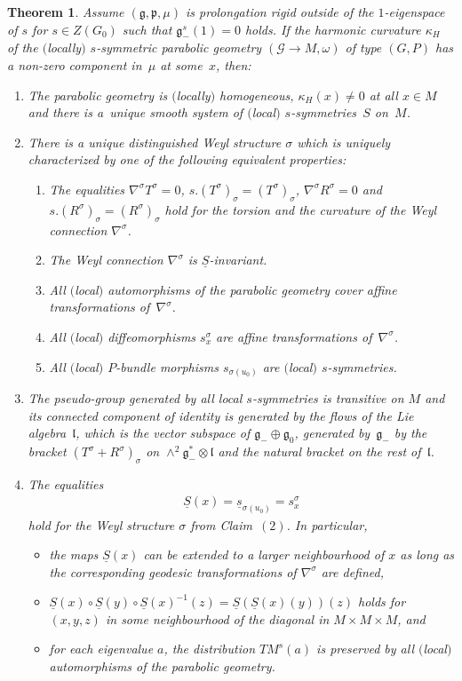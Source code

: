 \documentclass[pdftex]{sigma}
\newcommand{\om}{\omega}
\newcommand{\si}{\sigma}
\newcommand{\un}{\underline}
\newcommand{\ba}{\mathcal{G}}
\newcommand{\fg}{\mathfrak g}
\newcommand{\fp}{\mathfrak p}
\newcommand{\fl}{\mathfrak l}
\numberwithin{equation}{section}
\newtheorem{Theorem}{Theorem}[section]
\begin{document}
\begin{Theorem} \label{6.2}
Assume $(\fg,\fp,\mu)$ is prolongation rigid outside of the $1$-eigenspace of $s$ for $s\in Z(G_0)$ such that $\fg_-^s(1)=0$ holds. If the harmonic curvature $\kappa_H$ of the $($locally$)$ $s$-symmetric parabolic geometry $(\ba\to M,\om)$ of type $(G,P)$ has a non-zero component in~$\mu$ at some~$x$, then:
\begin{enumerate}\itemsep=0pt
\item[$1.$] The parabolic geometry is $($locally$)$ homogeneous, $\kappa_H(x)\neq 0$ at all $x\in M$ and there is a~unique smooth system of $($local$)$ $s$-symmetries~$S$ on~$M$.
\item[$2.$] There is a unique distinguished Weyl structure $\si$ which is uniquely characterized by one of the following equivalent properties:
\begin{enumerate}\itemsep=0pt
\item[$(a)$] The equalities $\nabla^\si T^\si=0$, $s.(T^\si)_\si=(T^\si)_\si$, $\nabla^\si R^\si=0$ and $s.(R^\si)_\si=(R^\si)_\si$ hold for the torsion and the curvature of the Weyl connection $\nabla^\si$.
\item[$(b)$] The Weyl connection $\nabla^\si$ is $\un S$-invariant.
\item[$(c)$] All $($local$)$ automorphisms of the parabolic geometry cover affine transformations of~$\nabla^\si$.
\item[$(d)$] All $($local$)$ diffeomorphisms $s_x^\si$ are affine transformations of~$\nabla^\si$.
\item[$(e)$] All $($local$)$ $P$-bundle morphisms $s_{\si(u_0)}$ are $($local$)$ $s$-symmetries.
\end{enumerate}
\item[$3.$] The pseudo-group generated by all local $s$-symmetries is transitive on $M$ and its connected component of identity is generated by the flows of the Lie algebra~$\fl$, which is the vector subspace of $\fg_-\oplus \fg_0$, generated by~$\fg_-$ by the bracket $(T^\si+R^\si)_\si$ on $\wedge^2 \fg_-^*\otimes \fl$ and the natural bracket on the rest of~$\fl$.
\item[$4.$] The equalities \begin{gather*}\un S(x)=\un s_{\si(u_0)}=s_x^\si\end{gather*}
hold for the Weyl structure $\si$ from Claim~$(2)$. In particular,
\begin{itemize}\itemsep=0pt
\item the maps $\un S(x)$ can be extended to a larger neighbourhood of $x$ as long as the corresponding geodesic transformations of $\nabla^\si$ are defined,
\item $\un S(x)\circ \un S(y)\circ \un S(x)^{-1}(z)=\un S(\un S(x)(y))(z)$ holds for $(x,y,z)$ in some neighbourhood of the diagonal in $M\times M\times M$, and
\item for each eigenvalue $a$, the distribution $TM^s(a)$ is preserved by all $($local$)$ automorphisms of the parabolic geometry.
\end{itemize}
\end{enumerate}
\end{Theorem}
\end{document}
